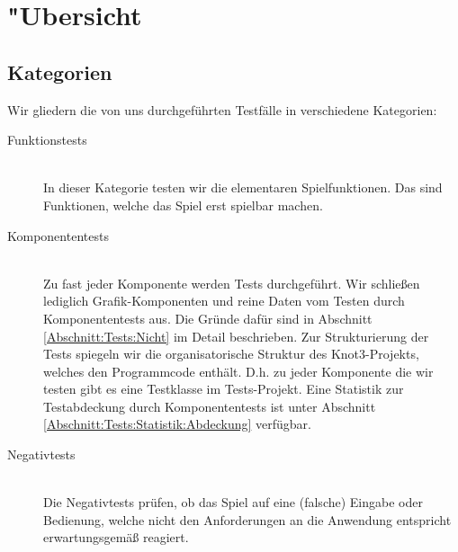 %



\section{{"U}bersicht}
\label{Abschnitt:Tests:Uebersicht}



\subsection{Kategorien}
\label{Abschnitt:Tests:Uebersicht:Kategorien}

Wir gliedern die von uns durchgeführten Testfälle in verschiedene Kategorien:\\


\begin{description} %


	\item[Funktionstests] \hfill
	\\
	
	In dieser Kategorie testen wir die elementaren Spielfunktionen. Das sind Funktionen, welche das Spiel erst spielbar machen.
	  
	
	\item[Komponententests] \hfill
	\\
	
	Zu fast jeder Komponente werden Tests durchgeführt. Wir schließen lediglich Grafik-Komponenten und reine Daten vom Testen durch Komponententests aus. Die Gründe dafür sind in Abschnitt \ref{Abschnitt:Tests:Nicht} im Detail beschrieben. Zur Strukturierung der Tests spiegeln wir die organisatorische Struktur des Knot3-Projekts, welches den Programmcode enthält. D.h. zu jeder Komponente die wir testen gibt es eine Testklasse im Tests-Projekt. Eine Statistik zur Testabdeckung durch Komponententests ist unter Abschnitt \ref{Abschnitt:Tests:Statistik:Abdeckung} verfügbar.\\


	\item[Negativtests] \hfill
	\\
	
	Die Negativtests prüfen, ob das Spiel auf eine (falsche) Eingabe oder Bedienung, welche nicht den Anforderungen an die Anwendung entspricht erwartungsgemäß reagiert.
	

\end{description}
